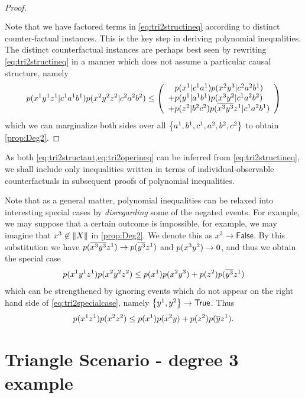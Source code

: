 \begin{proof}
\begin{align}
\begin{split}
\end{split}\end{align}
Note that we have factored terms in \cref{eq:tri2structineq} according to distinct counter-factual instances. This is the key step in deriving polynomial inequalities. The distinct counterfactual instances are perhaps best seen by rewriting \cref{eq:tri2structineq} in a manner which does not assume a particular causal structure, namely
\begin{align}\begin{split}\label{eq:tri2operineq}
p\lparen x^1 y^1 z^1|c^1 a^1 b^1\rparen p\lparen x^2 y^2 z^2|c^2 a^2 b^2\rparen
\leq
\left\lparen\begin{array}{l}
  \hphantom{+}p\lparen x^1|c^1 a^1\rparen p\lparen x^2 y^3|c^2 a^2 b^1\rparen
\\+p\lparen y^1|a^1 b^1\rparen p\lparen x^3 y^2|c^1 a^2 b^2\rparen 
\\+p\lparen z^2|b^2 c^2\rparen p\lparen\overline{x^3} \overline{y^3} z^1|c^1 a^2 b^1\rparen \end{array}\right\rparen
\end{split}\end{align}
which we can marginalize both sides over all  $\left\lbrace a^1,b^1,c^1,a^2,b^2,c^2\right\rbrace$ to obtain \cref{prop:Deg2}.
\end{proof}
As both \cref{eq:tri2structaut,eq:tri2operineq} can be inferred from \cref{eq:tri2structineq}, we shall include only inequalities written in terms of individual-observable counterfactuals in subsequent proofs of polynomial inequalities.



Note that as a general matter, polynomial inequalities can be relaxed into interesting special cases by \emph{disregarding} some of the negated events. For example, we may suppose that a certain outcome is impossible, for example, we may imagine that $x^3\not\in \lVert X\rVert$ in \cref{prop:Deg2}. We denote this as  $x^3\to \mathsf{False}$. By this substitution we have $p\lparen\overline{x^3} \overline{y^3} z^1\rparen \to p\lparen\overline{y^3} z^1\rparen$ and $p\lparen x^3
   y^2\rparen\to 0$, and thus we obtain the special case
\begin{align}\label{eq:tri2specialcase}
p\lparen x^1 y^1 z^1\rparen p\lparen x^2 y^2 z^2\rparen\leq p\lparen x^1\rparen p\lparen x^2 y^3\rparen+p\lparen z^2\rparen p\lparen\overline{y^3} z^1\rparen 
\end{align}
which can be strengthened by ignoring events which do not appear on the right hand side of \cref{eq:tri2specialcase}, namely $\left\lbrace y^1,y^2\right\rbrace\to \mathsf{True}$.  Thus
\begin{align}
p\lparen x^1 z^1\rparen p\lparen x^2 z^2\rparen\leq p\lparen x^1\rparen p\lparen x^2 y\rparen+p\lparen z^2\rparen p\lparen\overline{y} z^1\rparen .
\end{align}


\section{Triangle Scenario - degree 3 example}

